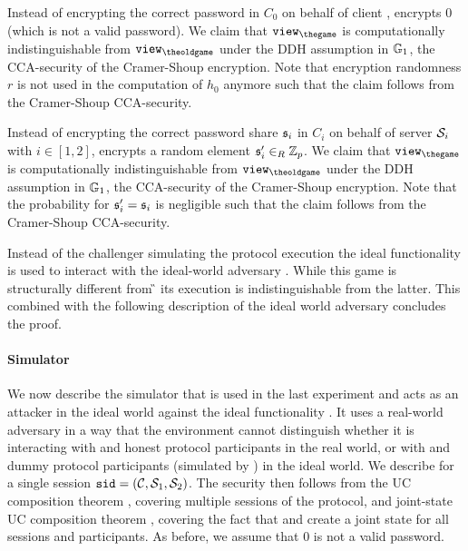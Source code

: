 \Gh Instead of encrypting the correct password \pwd in $C_0$ on behalf of client \Client, \Challenger encrypts $0$ (which is not a valid password).
We claim that $\view_{\thegame}$ is computationally indistinguishable from $\view_{\theoldgame}$ under the \ac{DDH} assumption in $\mathbb{G}_1$, \ie the \ac{CCA}-security of the Cramer-Shoup encryption.
Note that encryption randomness $r$ is not used in the computation of $h_0$ anymore such that the claim follows from the Cramer-Shoup \ac{CCA}-security.

\Gh Instead of encrypting the correct password share $\mathfrak{s}_i$ in $C_i$ on behalf of server $\mathcal{S}_i$ with $i\in[1,2]$, \Challenger encrypts a random element $\mathfrak{s}'_i\in_R\mathbb{Z}_p$.
We claim that $\view_{\thegame}$ is computationally indistinguishable from $\view_{\theoldgame}$ under the \ac{DDH} assumption in $\mathbb{G}_1$, \ie the \ac{CCA}-security of the Cramer-Shoup encryption.
Note that the probability for $\mathfrak{s}'_i=\mathfrak{s}_i$ is negligible such that the claim follows from the Cramer-Shoup \ac{CCA}-security.

\Gh Instead of the challenger \Challenger simulating the protocol execution the ideal functionality \FTWOPAKE is used to interact with the ideal-world adversary \SIM.
While this game is structurally different from \G{\theoldgame} its execution is indistinguishable from the latter.
This combined with the following description of the ideal world adversary \SIM concludes the proof.


\paragraph{Simulator}
We now describe the simulator \SIM that is used in the last experiment and acts as an attacker in the ideal world against the ideal functionality \FTWOPAKE.
It uses a real-world adversary \cA in a way that the environment \cZ cannot  distinguish whether it is interacting with \cA and honest protocol participants in the real world, or with \SIM and dummy protocol participants (simulated by \FTWOPAKE) in the ideal world.
We describe \SIM for a single session $\mathtt{sid}=(\mathcal{C}, \mathcal{S}_1, \mathcal{S}_2)$.
The security then follows from the \ac{UC} composition theorem \cite{Canetti2001a}, covering multiple sessions of the protocol, and joint-state \ac{UC} composition theorem \cite{CanettiR03}, covering the fact that \Fca and \Fcrs create a joint state for all sessions and participants.
As before, we assume that $0$ is not a valid password.

